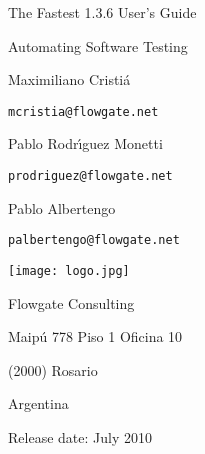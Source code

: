 \documentclass[a4paper,12pt, fleqn]{article}
\begin{document}
\thispagestyle{empty}

\begin{center}

\mbox{}\vspace{7cm}

{\Huge The Fastest 1.3.6 User's Guide}

\vspace{.5cm}

{\LARGE Automating Software Testing}

\vspace{2cm}

{\large Maximiliano Cristi\'{a}

{\tt mcristia@flowgate.net}

\vspace{0.5cm}


\begin{multicols}{2}
Pablo Rodr\'{\i}guez Monetti 

{\tt prodriguez@flowgate.net}

\vspace{0.5cm}

Pablo Albertengo

{\tt palbertengo@flowgate.net}

\end{multicols}}

\vspace{1.5cm}
\texttt{[image: logo.jpg]}
\vspace{1.5cm}

{\large Flowgate Consulting 

Maip\'{u} 778 Piso 1 Oficina 10

(2000) Rosario

Argentina}

\vspace{1cm}

Release date: July 2010
\end{center}

\pagebreak

\tableofcontents

\pagebreak

 \pagebreak

 \pagebreak

 \pagebreak

 \pagebreak

 \pagebreak

 \pagebreak

 \pagebreak
\end{document}
